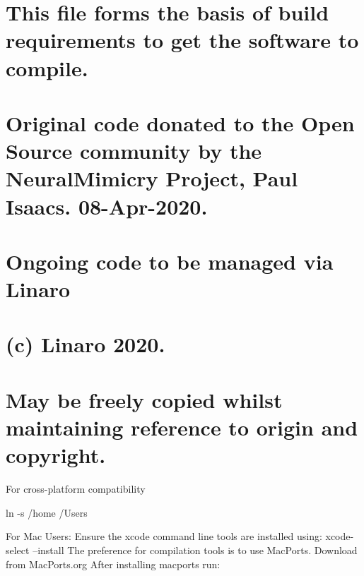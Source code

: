 \section*{This file forms the basis of build requirements to get the software to compile.}

\section*{Original code donated to the Open Source community by the Neural\+Mimicry Project, Paul Isaac\textquotesingle{}s. 08-\/\+Apr-\/2020.}

\section*{Ongoing code to be managed via Linaro}

\section*{(c) Linaro 2020.}

\section*{May be freely copied whilst maintaining reference to origin and copyright.}

For cross-\/platform compatibility


\begin{DoxyCode}
ln -s /home /Users
\end{DoxyCode}


For Mac Users\+: Ensure the xcode command line tools are installed using\+: xcode-\/select --install The preference for compilation tools is to use Mac\+Ports. Download from Mac\+Ports.\+org After installing macports run\+:



